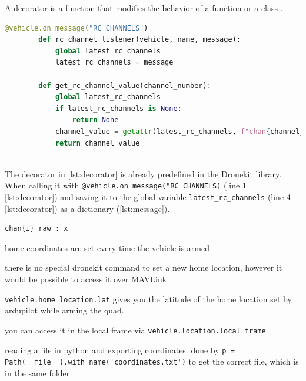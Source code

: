 \documentclass[svgnames]{article}
\begin{document}
	\begin{Explanation}[Decorator]
		\item A decorator is a function that modifies the behavior of a function or a class \cite{decorator}.
	\end{Explanation} 
	
	\begin{lstlisting}[language=python, style=myPython, label={lst:decorator}, caption={decorator for channel values}]
		@vehicle.on_message("RC_CHANNELS")
		def rc_channel_listener(vehicle, name, message):
			global latest_rc_channels
			latest_rc_channels = message
		
		def get_rc_channel_value(channel_number):
			global latest_rc_channels
			if latest_rc_channels is None:
				return None
			channel_value = getattr(latest_rc_channels, f"chan{channel_number}_raw", None)
			return channel_value
		
	\end{lstlisting}
	The decorator in \cref{lst:decorator} is already predefined in the Dronekit library. When calling it with \lstinline|@vehicle.on_message("RC_CHANNELS)| (line 1 \cref{lst:decorator}) and saving it to the global variable \lstinline|latest_rc_channels| (line 4 \cref{lst:decorator}) as a dictionary (\cref{lst:message}).
	
	\begin{lstlisting}[label=lst:message, caption={output from decorator in \cref{lst:decorator}\protect\footnote{}}]
		chan{i}_raw : x
	\end{lstlisting}
	\pagebreak
	
	
	
	
	
	
	
	
	home coordinates are set every time the vehicle is armed
	
	there is no special dronekit command to set a new home location, however it would be possible to access it over MAVLink
	
	\lstinline|vehicle.home_location.lat| gives you the latitude of the home location set by ardupilot while arming the quad.
	
	you can access it in the local frame via \lstinline|vehicle.location.local_frame|
	
	
	reading a file in python and exporting coordinates.
	done by \lstinline|p = Path(__file__).with_name('coordinates.txt')| to get the correct file, which is in the same folder
	
\end{document}
